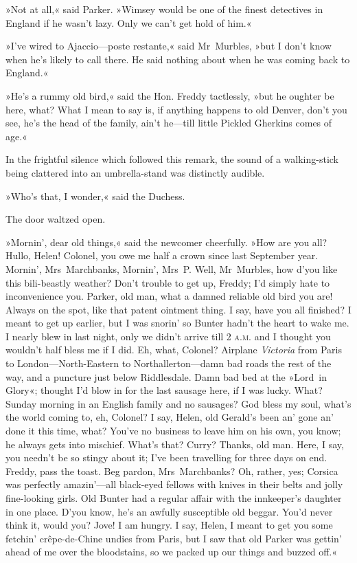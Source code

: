 »Not at all,« said Parker. »Wimsey would be one of the finest detectives in England if he wasn't lazy. Only we can't get hold of him.«

»I've wired to Ajaccio—poste restante,« said Mr~Murbles, »but I don't know when he's likely to call there. He said nothing about when he was coming back to England.«

»He's a rummy old bird,« said the Hon. Freddy tactlessly, »but he oughter be here, what? What I mean to say is, if anything happens to old Denver, don't you see, he's the head of the family, ain't he—till little Pickled Gherkins comes of age.«

In the frightful silence which followed this remark, the sound of a walking-stick being clattered into an umbrella-stand was distinctly
audible.

»Who's that, I wonder,« said the Duchess.

The door waltzed open.

»Mornin', dear old things,« said the newcomer cheerfully. »How are you all? Hullo, Helen! Colonel, you owe me half a crown since last September year. Mornin', Mrs~Marchbanks, Mornin', Mrs~P. Well, Mr~Murbles, how d'you like this bili-beastly weather? Don't trouble to get up, Freddy; I'd simply hate to inconvenience you. Parker, old man, what a damned reliable old bird you are! Always on the spot, like that patent ointment thing. I say, have you all finished? I meant to get up earlier, but I was snorin' so Bunter hadn't the heart to wake me. I nearly blew in last night, only we didn't arrive till 2 \textsc{a.m.} and I thought you wouldn't half bless me if I did. Eh, what, Colonel? Airplane \textit{Victoria} from Paris to London—North-Eastern to Northallerton—damn bad roads the rest of the way, and a puncture just below Riddlesdale. Damn bad bed at the »Lord~in Glory«; thought I'd blow in for the last sausage here, if I was lucky. What? Sunday morning in an English family and no sausages? God bless my soul, what's the world coming to, eh, Colonel? I say, Helen, old Gerald's been an' gone an' done it this time, what? You've no business to leave him on his own, you know; he always gets into mischief. What's that? Curry? Thanks, old man. Here, I say, you needn't be so stingy about it; I've been travelling for three days on end. Freddy, pass the toast. Beg pardon, Mrs~Marchbanks? Oh, rather, yes; Corsica was perfectly amazin'—all black-eyed fellows with knives in their belts and jolly fine-looking girls. Old Bunter had a regular affair with the innkeeper's daughter in one place. D'you know, he's an awfully susceptible old beggar. You'd never think it, would you? Jove! I am hungry. I say, Helen, I meant to get you some fetchin' crêpe-de-Chine undies from Paris, but I saw that old Parker was gettin' ahead of me over the bloodstains, so we packed up our things and buzzed off.«

